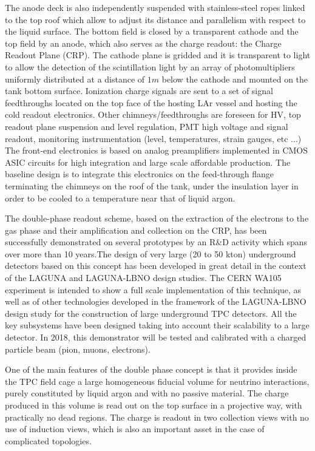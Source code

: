 The anode deck is also independently suspended with stainless-steel ropes linked to the top roof  which allow to adjust its distance and parallelism with respect to the liquid surface.  The bottom field is  closed by a transparent cathode and the top field by an anode, which also  serves as the charge readout: the Charge Readout Plane (CRP).  The cathode plane is gridded and it is transparent to light to allow the detection of the scintillation light by an array of photomultipliers uniformly distributed  at a distance of $1m$  below the cathode and mounted on the tank bottom surface. Ionization charge signals are sent to a set of signal feedthroughs located on the top face of the hosting LAr vessel and hosting the cold readout electronics. Other chimneys/feedthroughs are foreseen for HV, top readout plane suspension and level regulation, PMT high voltage and signal readout, monitoring instrumentation (level, temperatures, strain gauges, etc ...) The front-end electronics is based on analog preamplifiers implemented in CMOS ASIC circuits for high integration and large scale affordable production. The baseline design is to integrate this electronics on the feed-through flange terminating the chimneys on the roof of the tank, under the insulation layer in order to be cooled to a temperature near that of liquid argon.

The double-phase readout scheme, based on the extraction of the electrons to the gas phase and their amplification and collection on the CRP, has been successfully demonstrated on several prototypes  by an R\&D activity which spans over more than 10 years.The design of very large (20 to 50 kton) underground detectors based on this concept has been developed in great detail in the context of the LAGUNA and LAGUNA-LBNO design studies.  The CERN WA105 experiment is intended to show a full scale implementation of this technique, as well as of other technologies developed in the framework of the LAGUNA-LBNO design study for the construction of large underground TPC detectors.  All the key subsystems have been designed taking into account their scalability to a large detector.  In 2018, this demonstrator will be tested and calibrated with a charged particle beam (pion, muons, electrons).

One of the main features of the double phase concept is that it provides inside the TPC field cage a large homogeneous fiducial volume for neutrino interactions, purely constituted by liquid argon and with no passive material. The charge produced in this volume is read out on the top surface in a projective way, with practically no dead regions. The charge is readout in two collection views with no use of induction views, which is also an important asset in the case of complicated topologies. 

